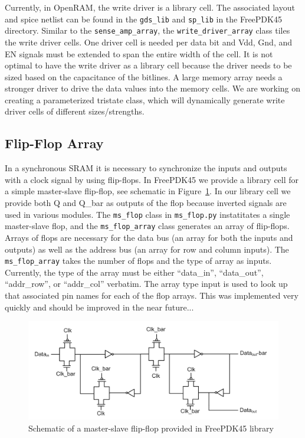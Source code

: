 Currently, in OpenRAM, the write driver is a library cell.  The
associated layout and spice netlist can be found in the \verb|gds_lib| and
\verb|sp_lib| in the FreePDK45 directory.  Similar to the \verb|sense_amp_array|,
the \verb|write_driver_array| class tiles the write driver cells.  One
driver cell is needed per data bit and Vdd, Gnd, and EN signals must
be extended to span the entire width of the cell. It is not optimal to
have the write driver as a library cell because the driver needs to be
sized based on the capacitance of the bitlines.  A large memory array
needs a stronger driver to drive the data values into the memory
cells.  We are working on creating a parameterized tristate class,
which will dynamically generate write driver cells of different
sizes/strengths.

\subsection{Flip-Flop Array}

In a synchronous SRAM it is necessary to synchronize the inputs and
outputs with a clock signal by using flip-flops.  In FreePDK45 we
provide a library cell for a simple master-slave flip-flop, see
schematic in Figure~\ref{fig:ms_flop}.  In our library cell we provide
both Q and Q\_bar as outputs of the flop because inverted signals are
used in various modules.  The \verb|ms_flop| class in \verb|ms_flop.py|
instatitates a single master-slave flop, and the \verb|ms_flop_array| class
generates an array of flip-flops.  Arrays of flops are necessary for
the data bus (an array for both the inputs and outputs) as well as the
address bus (an array for row and column inputs).  The \verb|ms_flop_array|
takes the number of flops and the type of array as inputs.  Currently,
the type of the array must be either ``data\_in'', ``data\_out'',
``addr\_row'', or ``addr\_col'' verbatim.  The array type input is
used to look up that associated pin names for each of the flop arrays.
This was implemented very quickly and should be improved in the near
future...

\begin{figure}[h!]
\centering
\includegraphics[scale=.7]{./figs/ms_flop_schem.pdf}
\caption{Schematic of a master-slave flip-flop provided in FreePDK45 library}
\label{fig:ms_flop}
\end{figure}

